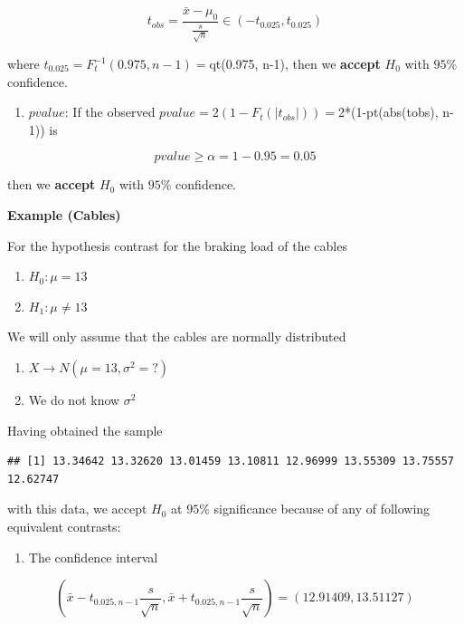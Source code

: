 \documentclass[
]{book}
\providecommand{\tightlist}{%
  \setlength{\itemsep}{0pt}\setlength{\parskip}{0pt}}
\begin{document}
\[t_{obs}=\frac{\bar{x}-\mu_0}{\frac{s}{\sqrt{n}}} \in (-t_{0.025}, t_{0.025})\]

where \(t_{0.025}=F_t^{-1}(0.975, n-1)=\)qt(0.975, n-1), then we \textbf{accept} \(H_0\) with \(95\%\) confidence.

\begin{enumerate}
\def\labelenumi{\arabic{enumi}.}
\setcounter{enumi}{2}
\tightlist
\item
  \(pvalue\): If the observed \(pvalue= 2 (1-F_t(|t_{obs}|))=\)2*(1-pt(abs(tobs), n-1)) is
\end{enumerate}

\[pvalue \geq \alpha =1-0.95=0.05\]

then we \textbf{accept} \(H_0\) with \(95\%\) confidence.

\textbf{Example (Cables)}

For the hypothesis contrast for the braking load of the cables

\begin{enumerate}
\def\labelenumi{\alph{enumi}.}
\tightlist
\item
  \(H_0:\mu = 13\)
\item
  \(H_1:\mu \neq 13\)
\end{enumerate}

We will only assume that the cables are normally distributed

\begin{enumerate}
\def\labelenumi{\arabic{enumi}.}
\tightlist
\item
  \(X \rightarrow N(\mu=13, \sigma^2=?)\)
\item
  We do not know \(\sigma^2\)
\end{enumerate}

Having obtained the sample

\begin{verbatim}
## [1] 13.34642 13.32620 13.01459 13.10811 12.96999 13.55309 13.75557 12.62747
\end{verbatim}

with this data, we accept \(H_0\) at \(95\%\) significance because of any of following equivalent contrasts:

\begin{enumerate}
\def\labelenumi{\arabic{enumi}.}
\tightlist
\item
  The confidence interval
\end{enumerate}

\[(\bar{x}-t_{0.025, n-1} \frac{s}{\sqrt{n}}, \bar{x}+t_{0.025, n-1} \frac{s}{\sqrt{n}})=(12.91409, 13.51127)\]
\end{document}
